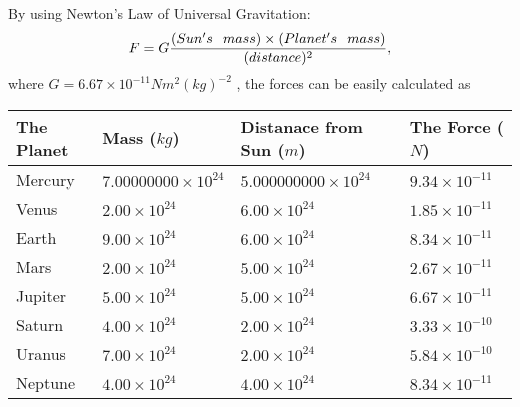 \documentclass[12pt]{article}
\begin{document}
 
 
 
\noindent{}
 
 

By using Newton's Law of Universal Gravitation:
\[
F=G \frac{(Sun's \hspace{0.1in} mass) \times (Planet's \hspace{0.1in} mass)} { (distance)^2},
\]
where
$ G= %
6.67 \times 10^{-11}N m^{2}(kg)^{-2}$ , the forces can be easily calculated as
 
\vspace{0.2in}
 
 
\begin{tabular}{|l|l|l|l|}
\hline
The Planet & Mass ($kg$) & Distanace from Sun ($m$) & The Force ($N$)\\
\hline
Mercury  &
           $ %
7.00000000 \times 10^{24} $   &
             $ %
5.000000000 \times 10^{24} $    & $ %
9.34 \times 10^{-11} $
\\  \hline
Venus    &
           $  %
2.00 \times 10^{24}  $     &
             $ %
6.00 \times 10^{24} $    & $ %
1.85 \times 10^{-11} $
\\  \hline
Earth    &
           $  %
9.00 \times 10^{24}  $     &
             $ %
6.00 \times 10^{24} $    & $ %
8.34 \times 10^{-11} $
\\   \hline
Mars     &
           $  %
2.00 \times 10^{24} $     &
             $ %
5.00 \times 10^{24} $    & $ %
2.67 \times 10^{-11} $
\\   \hline
Jupiter  &
           $  %
5.00 \times 10^{24} $    &
             $ %
5.00 \times 10^{24} $    & $ %
6.67 \times 10^{-11} $
\\  \hline
Saturn   &
           $  %
4.00 \times 10^{24} $    &
             $ %
2.00 \times 10^{24}  $    & $ %
3.33 \times 10^{-10} $
\\  \hline
Uranus   &
           $  %
7.00 \times 10^{24} $    &
             $ %
2.00 \times 10^{24} $    & $ %
5.84 \times 10^{-10} $
\\  \hline
Neptune  &
           $  %
4.00 \times 10^{24} $    &
             $ %
4.00 \times 10^{24} $    & $ %
8.34 \times 10^{-11} $
\\  \hline
 
\end{tabular}
 
 
 
 
\noindent{}
 
\end{document}
